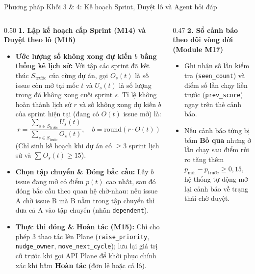 \begin{frame}{Phương pháp Khối 3 \& 4: Kế hoạch Sprint, Duyệt lô và Agent hỏi đáp}
  \scriptsize
  \begin{columns}[T,onlytextwidth]
    \begin{column}{0.50\textwidth}
      \textbf{1. Lập kế hoạch cấp Sprint (M14) và Duyệt theo lô (M15)}
      \begin{itemize}
        \setlength{\itemsep}{1.5pt}
        \item \textbf{Ước lượng số không xong dự kiến $b$ bằng thống kê lịch sử:} Với tập các sprint đã kết thúc $S_{\text{trước}}$ của cùng dự án, gọi $O_s(t)$ là số issue còn mở tại mốc $t$ và $U_s(t)$ là số lượng trong đó không xong cuối sprint $s$. Tỉ lệ không hoàn thành lịch sử $r$ và số không xong dự kiến $b$ của sprint hiện tại (đang có $O(t)$ issue mở) là:
        $$r = \frac{\sum_{s \in S_{\text{trước}}} U_s(t)}{\sum_{s \in S_{\text{trước}}} O_s(t)}, \quad b = \mathrm{round}(r \cdot O(t))$$
        {\tiny (Chỉ sinh kế hoạch khi dự án có $\ge 3$ sprint lịch sử và $\sum O_s(t) \ge 15$).}
        \item \textbf{Chọn tập chuyển \& Đóng bắc cầu:} Lấy $b$ issue đang mở có điểm $p(t)$ cao nhất, sau đó \alert{đóng bắc cầu theo quan hệ chờ-nhau}: nếu issue A chờ issue B mà B nằm trong tập chuyển thì đưa cả A vào tập chuyển (nhãn \texttt{dependent}).
        \item \textbf{Thực thi đóng \& Hoàn tác (M15):} Chỉ cho phép 3 thao tác lên Plane (\texttt{raise\_priority}, \texttt{nudge\_owner}, \texttt{move\_next\_cycle}); lưu lại giá trị cũ trước khi gọi API Plane để khôi phục chính xác khi bấm \textbf{Hoàn tác} (đơn lẻ hoặc cả lô).
      \end{itemize}
    \end{column}
    \begin{column}{0.47\textwidth}
      \textbf{2. Sổ cảnh báo theo dõi vòng đời (Module M17)}
      \begin{itemize}
        \setlength{\itemsep}{1pt}
        \item Ghi nhận số lần kiểm tra (\texttt{seen\_count}) và điểm số lần chạy liền trước (\texttt{prev\_score}) ngay trên thẻ cảnh báo.
        \item Nếu cảnh báo từng bị bấm \textbf{Bỏ qua} nhưng ở lần chạy sau điểm rủi ro tăng thêm $p_{\text{mới}} - p_{\text{trước}} \ge 0{,}15$, hệ thống tự động mở lại cảnh báo về trạng thái chờ duyệt.
      \end{itemize}
      \vspace{0.05cm}

\end{column}
\end{columns}
\end{frame}
